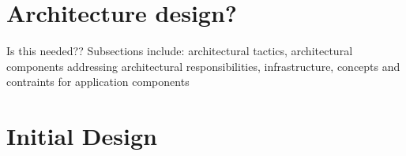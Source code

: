 \documentclass[a4paper,12pt]{article}
\begin{document}
\section{Architecture design?}
	Is this needed?? Subsections include: architectural tactics, architectural components addressing architectural responsibilities, infrastructure, concepts and contraints for application components

\newpage
%
%




\section{Initial Design}  %


\newpage
%
%
\end{document}
